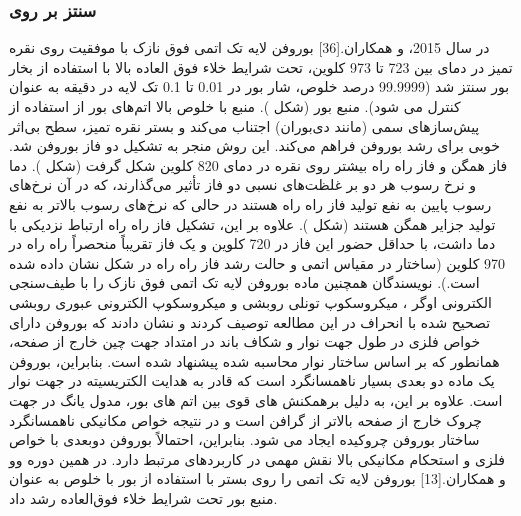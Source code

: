 \subsubsection{سنتز بر روی  }
در سال 2015،  و همکاران.\cite{mannixSynthesisBorophenesAnisotropic2015}[36] بوروفن لایه تک اتمی فوق نازک با موفقیت روی نقره تمیز در دمای بین 723 تا 973 کلوین، تحت شرایط خلاء فوق العاده بالا با استفاده از بخار بور سنتز شد (99.9999 درصد خلوص، شار بور در 0.01 تا 0.1 تک لایه در دقیقه به عنوان \lr{[$ML min^{-1}]$} کنترل می شود). منبع بور (شکل ). منبع با خلوص بالا اتم‌های بور از استفاده از پیش‌سازهای سمی (مانند دی‌بوران) اجتناب می‌کند و بستر نقره تمیز، سطح بی‌اثر خوبی برای رشد بوروفن فراهم می‌کند. این روش منجر به تشکیل دو فاز بوروفن شد. فاز همگن و فاز راه راه بیشتر روی نقره در دمای 820 کلوین شکل گرفت (شکل ). دما و نرخ رسوب هر دو بر غلظت‌های نسبی دو فاز تأثیر می‌گذارند، که در آن نرخ‌های رسوب پایین به نفع تولید فاز راه راه هستند در حالی که نرخ‌های رسوب بالاتر به نفع تولید جزایر همگن هستند (شکل ). علاوه بر این، تشکیل فاز راه راه ارتباط نزدیکی با دما داشت، با حداقل حضور این فاز در 720 کلوین و یک فاز تقریباً منحصراً راه راه در 970 کلوین (ساختار در مقیاس اتمی و حالت رشد فاز راه راه در شکل  نشان داده شده است.). نویسندگان همچنین ماده بوروفن لایه تک اتمی فوق نازک را با طیف‌سنجی الکترونی اوگر ، میکروسکوپ تونلی روبشی  و میکروسکوپ الکترونی عبوری روبشی تصحیح شده با انحراف  در این مطالعه توصیف کردند و نشان دادند که بوروفن دارای خواص فلزی در طول جهت نوار و شکاف باند در امتداد جهت چین خارج از صفحه، همانطور که بر اساس ساختار نوار محاسبه شده پیشنهاد شده است. بنابراین، بوروفن یک ماده دو بعدی بسیار ناهمسانگرد است که قادر به هدایت الکتریسیته در جهت نوار است. علاوه بر این، به دلیل برهمکنش های قوی بین اتم های بور، مدول یانگ در جهت چروک خارج از صفحه بالاتر از گرافن است و در نتیجه خواص مکانیکی ناهمسانگرد ساختار بوروفن چروکیده ایجاد می شود. بنابراین، احتمالاً بوروفن دوبعدی با خواص فلزی و استحکام مکانیکی بالا نقش مهمی در کاربردهای مرتبط دارد. در همین دوره وو و همکاران.\cite{fengDirectEvidenceMetallic2016}[13] بوروفن لایه تک اتمی را روی بستر  با استفاده از بور با خلوص  به عنوان منبع بور تحت شرایط خلاء فوق‌العاده رشد داد.

